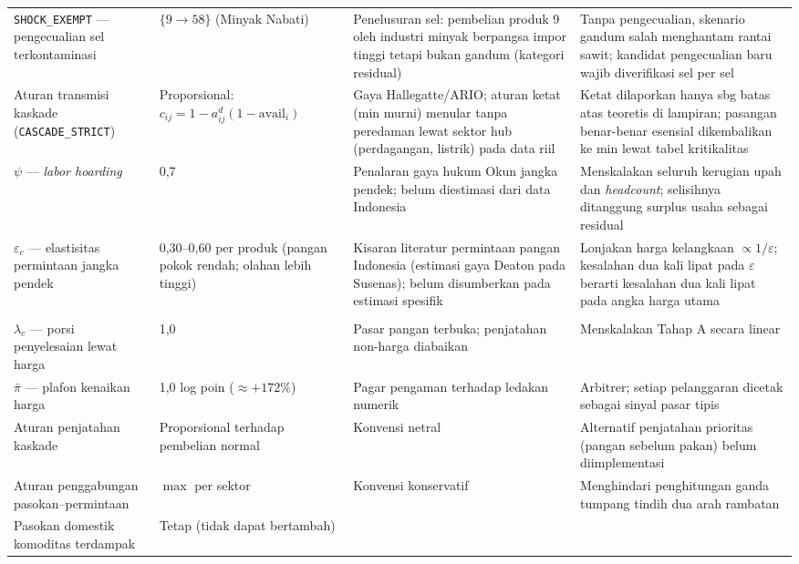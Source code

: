 \documentclass[
  manuscript=article,
  layout=publish,
  year=2026,
  volume=1,
]{den}
\newcommand{\en}[1]{\textit{#1}}
\begin{document}
\begin{landscape}
\begin{longtable}{@{}p{3.6cm}p{3.6cm}p{6.5cm}p{7.5cm}@{}}
\addlinespace[3pt]
\texttt{SHOCK\_EXEMPT} --- pengecualian sel terkontaminasi &
$\{9 \to 58\}$ (Minyak Nabati) &
Penelusuran sel: pembelian produk 9 oleh industri minyak berpangsa impor
tinggi tetapi bukan gandum (kategori residual) &
Tanpa pengecualian, skenario gandum salah menghantam rantai sawit;
kandidat pengecualian baru wajib diverifikasi sel per sel \\
\addlinespace[3pt]
Aturan transmisi kaskade (\texttt{CASCADE\_STRICT}) &
Proporsional: $c_{ij} = 1 - a^d_{ij}(1 - \text{avail}_i)$ &
Gaya Hallegatte/ARIO; aturan ketat (min murni) menular tanpa peredaman
lewat sektor hub (perdagangan, listrik) pada data riil &
Ketat dilaporkan hanya sbg batas atas teoretis di lampiran; pasangan
benar-benar esensial dikembalikan ke min lewat tabel kritikalitas \\
\addlinespace[3pt]
$\psi$ --- \en{labor hoarding} &
0{,}7 &
Penalaran gaya hukum Okun jangka pendek; belum diestimasi dari data
Indonesia &
Menskalakan seluruh kerugian upah dan \en{headcount}; selisihnya
ditanggung surplus usaha sebagai residual \\
\addlinespace[3pt]
$\varepsilon_c$ --- elastisitas permintaan jangka pendek &
0{,}30--0{,}60 per produk (pangan pokok rendah; olahan lebih tinggi) &
Kisaran literatur permintaan pangan Indonesia (estimasi gaya Deaton pada
Susenas); belum disumberkan pada estimasi spesifik &
Lonjakan harga kelangkaan $\propto 1/\varepsilon$; kesalahan dua kali
lipat pada $\varepsilon$ berarti kesalahan dua kali lipat pada angka
harga utama \\
\addlinespace[5pt]
\multicolumn{4}{@{}l}{\emph{Tier 2 --- saklar struktural/perilaku}}\\
\addlinespace[2pt]
$\lambda_c$ --- porsi penyelesaian lewat harga &
1{,}0 &
Pasar pangan terbuka; penjatahan non-harga diabaikan &
Menskalakan Tahap A secara linear \\
$\bar\pi$ --- plafon kenaikan harga &
1{,}0 log poin ($\approx +172\%$) &
Pagar pengaman terhadap ledakan numerik &
Arbitrer; setiap pelanggaran dicetak sebagai sinyal pasar tipis \\
Aturan penjatahan kaskade &
Proporsional terhadap pembelian normal &
Konvensi netral &
Alternatif penjatahan prioritas (pangan sebelum pakan) belum
diimplementasi \\
Aturan penggabungan pasokan--permintaan &
$\max$ per sektor &
Konvensi konservatif &
Menghindari penghitungan ganda tumpang tindih dua arah rambatan \\
Pasokan domestik komoditas terdampak &
Tetap (tidak dapat bertambah) &

\end{longtable}
\end{landscape}
\end{document}
